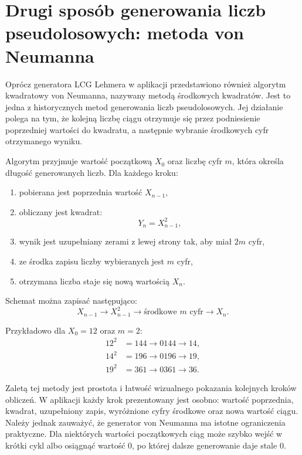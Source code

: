 \documentclass[12pt,a4paper]{article}
\begin{document}
\section{Drugi sposób generowania liczb pseudolosowych: metoda von Neumanna}

Oprócz generatora LCG Lehmera w aplikacji przedstawiono również algorytm kwadratowy von Neumanna, nazywany metodą środkowych kwadratów. Jest to jedna z historycznych metod generowania liczb pseudolosowych. Jej działanie polega na tym, że kolejną liczbę ciągu otrzymuje się przez podniesienie poprzedniej wartości do kwadratu, a następnie wybranie środkowych cyfr otrzymanego wyniku.

Algorytm przyjmuje wartość początkową $X_0$ oraz liczbę cyfr $m$, która określa długość generowanych liczb. Dla każdego kroku:
\begin{enumerate}
  \item pobierana jest poprzednia wartość $X_{n-1}$,
  \item obliczany jest kwadrat:
  \begin{equation}
    Y_n = X_{n-1}^2,
  \end{equation}
  \item wynik jest uzupełniany zerami z lewej strony tak, aby miał $2m$ cyfr,
  \item ze środka zapisu liczby wybieranych jest $m$ cyfr,
  \item otrzymana liczba staje się nową wartością $X_n$.
\end{enumerate}

Schemat można zapisać następująco:
\begin{equation}
  X_{n-1} \rightarrow X_{n-1}^2 \rightarrow \text{środkowe } m \text{ cyfr} \rightarrow X_n.
\end{equation}

Przykładowo dla $X_0 = 12$ oraz $m = 2$:
\begin{align}
  12^2 &= 144 \rightarrow 0144 \rightarrow 14,\\
  14^2 &= 196 \rightarrow 0196 \rightarrow 19,\\
  19^2 &= 361 \rightarrow 0361 \rightarrow 36.
\end{align}

Zaletą tej metody jest prostota i łatwość wizualnego pokazania kolejnych kroków obliczeń. W aplikacji każdy krok prezentowany jest osobno: wartość poprzednia, kwadrat, uzupełniony zapis, wyróżnione cyfry środkowe oraz nowa wartość ciągu. Należy jednak zauważyć, że generator von Neumanna ma istotne ograniczenia praktyczne. Dla niektórych wartości początkowych ciąg może szybko wejść w krótki cykl albo osiągnąć wartość $0$, po której dalsze generowanie daje stale $0$.
\end{document}
